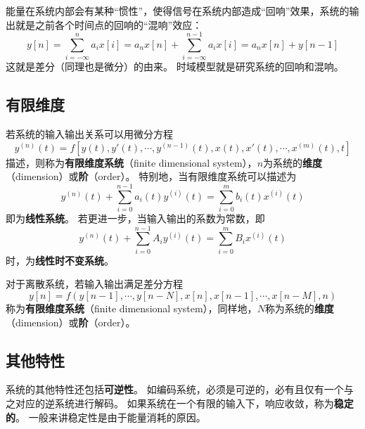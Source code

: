能量在系统内部会有某种“惯性”，使得信号在系统内部造成“回响”效果，系统的输出就是之前各个时间点的回响的“混响”效应：
\[
y\left[ n \right] =\sum_{i=-\infty}^n{a_ix\left[ i \right]}=a_nx\left[ n \right] +\sum_{i=-\infty}^{n-1}{a_ix\left[ i \right]}=a_nx\left[ n \right] +y\left[ n-1 \right]
\]
这就是差分（同理也是微分）的由来。
时域模型就是研究系统的回响和混响。

\subsection{有限维度}

若系统的输入输出关系可以用微分方程
\[
y^{\left( n \right)}\left( t \right) = f\left[ y\left( t \right) ,y'\left( t \right) ,\cdots ,y^{\left( n-1 \right)}\left( t \right) , x\left( t \right) ,x'\left( t \right) ,\cdots ,x^{\left( m \right)}\left( t \right) ,t \right]
\]
描述，则称为{\bf 有限维度系统}（finite dimensional system），$n$为系统的{\bf 维度}（dimension）或{\bf 阶}（order）。
特别地，当有限维度系统可以描述为
\[
y^{\left( n \right)}\left( t \right) +\sum_{i=0}^{n-1}{a_i\left( t \right) y^{\left( i \right)}\left( t \right)}=\sum_{i=0}^m{b_i\left( t \right) x^{\left( i \right)}\left( t \right)}
\]
即为{\bf 线性系统}。
若更进一步，当输入输出的系数为常数，即
\[
y^{\left( n \right)}\left( t \right) +\sum_{i=0}^{n-1}{A_iy^{\left( i \right)}\left( t \right)}=\sum_{i=0}^m{B_ix^{\left( i \right)}\left( t \right)}
\]
时，为{\bf 线性时不变系统}。

对于离散系统，若输入输出满足差分方程
\[
y\left[ n \right] = f\left( y\left[ n-1 \right] ,\cdots ,y\left[ n-N \right] ,x\left[ n \right] ,x\left[ n-1 \right] ,\cdots ,x\left[ n-M \right] ,n \right)
\]
称为{\bf 有限维度系统}（finite dimensional system），同样地，$N$称为系统的{\bf 维度}（dimension）或{\bf 阶}（order）。

\subsection{其他特性}

系统的其他特性还包括{\bf 可逆性}。
如编码系统，必须是可逆的，必有且仅有一个与之对应的逆系统进行解码。
如果系统在一个有限的输入下，响应收敛，称为{\bf 稳定的}。
一般来讲稳定性是由于能量消耗的原因。




